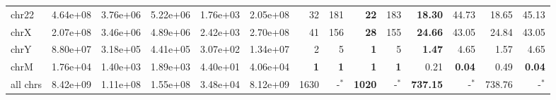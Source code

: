 \begin{table*}[!ht]
\begin{tabular}{@{}lrrrrrrrrrrrrr@{}}
		chr22 & 4.64e+08 & 3.76e+06 & 5.22e+06 & 1.76e+03 & 2.05e+08 & 32 & 181 & \textbf{22} & 183 & \textbf{18.30} & 44.73 & 18.65 & 45.13 \\ 
		chrX & 2.07e+08 & 3.46e+06 & 4.89e+06 & 2.42e+03 & 2.70e+08 & 41 & 156 & \textbf{28} & 155 & \textbf{24.66} & 43.05 & 24.84 & 43.05 \\ 
		chrY & 8.80e+07 & 3.18e+05 & 4.41e+05 & 3.07e+02 & 1.34e+07 & 2 & 5 & \textbf{1} & 5 & \textbf{1.47} & 4.65 & 1.57 & 4.65 \\ 
		chrM & 1.76e+04 & 1.40e+03 & 1.89e+03 & 4.40e+01 & 4.06e+04 & \textbf{1} & \textbf{1} & \textbf{1} & \textbf{1} & 0.21 & \textbf{0.04} & 0.49 & \textbf{0.04}  \\ 
		all chrs & 8.42e+09 & 1.11e+08 & 1.55e+08 & 3.48e+04 & 8.12e+09 & 1630 & -$^{*}$ & \textbf{1020} & -$^{*}$  & \textbf{737.15} & -$^{*}$ & 738.76 & -$^{*}$ \\
		\bottomrule
	\end{tabular}
\end{table*}